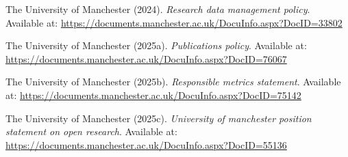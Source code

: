 \documentclass[
  british,
]{article}
\newlength{\cslhangindent}
\newenvironment{CSLReferences}[2] %
 {\begin{list}{}{%
  \setlength{\itemindent}{0pt}
  \setlength{\leftmargin}{0pt}
  \setlength{\parsep}{0pt}
  \ifodd #1
   \setlength{\leftmargin}{\cslhangindent}
   \setlength{\itemindent}{-1\cslhangindent}
  \fi
  \setlength{\itemsep}{#2\baselineskip}}}
 {\end{list}}
\begin{document}
\protect{}\label{refs}
\begin{CSLReferences}{1}{0}
The University of Manchester (2024). \emph{Research data management
policy}. Available at:
\url{https://documents.manchester.ac.uk/DocuInfo.aspx?DocID=33802}

The University of Manchester (2025a). \emph{Publications policy}.
Available at:
\url{https://documents.manchester.ac.uk/DocuInfo.aspx?DocID=76067}

The University of Manchester (2025b). \emph{Responsible metrics
statement}. Available at:
\url{https://documents.manchester.ac.uk/DocuInfo.aspx?DocID=75142}

The University of Manchester (2025c). \emph{University of manchester
position statement on open research}. Available at:
\url{https://documents.manchester.ac.uk/DocuInfo.aspx?DocID=55136}

\end{CSLReferences}
\end{document}
